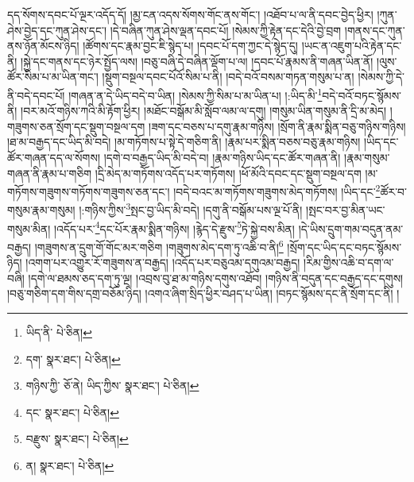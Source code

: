དད་སོགས་དབང་པོ་ལྔར་འདོད་དོ། །མྱ་ངན་འདས་སོགས་གོང་ནས་གོང་། །འཐོབ་པ་ལ་ནི་དབང་བྱེད་ཕྱིར། །ཀུན་ཤེས་བྱེད་དང་ཀུན་ཤེས་དང་། །དེ་བཞིན་ཀུན་ཤེས་ལྡན་དབང་པོ། །སེམས་ཀྱི་རྟེན་དང་དེའི་བྱེ་བྲག །གནས་དང་ཀུན་ནས་ཉོན་མོངས་ཉིད། །ཚོགས་དང་རྣམ་བྱང་ཇི་སྙེད་པ། །དབང་པོ་དག་ཀྱང་དེ་སྙེད་དུ། །ཡང་ན་འཇུག་པའི་རྟེན་དང་ནི། །སྐྱེ་དང་གནས་དང་ཉེར་སྤྱོད་ལས། །བཅུ་བཞི་དེ་བཞིན་ལྡོག་པ་ལ། །དབང་པོ་རྣམས་ནི་གཞན་ཡིན་ནོ། །ལུས་ཚོར་སིམ་པ་མ་ཡིན་གང་། །སྡུག་བསྔལ་དབང་པོའོ་སིམ་པ་ནི། །བདེ་བའོ་བསམ་གཏན་གསུམ་པ་ན། །སེམས་ཀྱི་དེ་ནི་བདེ་དབང་པོ། །གཞན་ན་དེ་ཡིད་བདེ་བ་ཡིན། །སེམས་ཀྱི་སིམ་པ་མ་ཡིན་པ། །:ཡིད་མི་\footnote{ཡིད་ནི་  པེ་ཅིན། }བདེ་བའོ་བཏང་སྙོམས་ནི། །བར་མའོ་གཉིས་ཀའི་མི་རྟོག་ཕྱིར། །མཐོང་བསྒོམ་མི་སློབ་ལམ་ལ་དགུ། །གསུམ་ཡིན་གསུམ་ནི་དྲི་མ་མེད། །གཟུགས་ཅན་སྲོག་དང་སྡུག་བསྔལ་དག །ཟག་དང་བཅས་པ་དགུ་རྣམ་གཉིས། །སྲོག་ནི་རྣམ་སྨིན་བཅུ་གཉིས་གཉིས། །ཐ་མ་བརྒྱད་དང་ཡིད་མི་བདེ། །མ་གཏོགས་པ་སྟེ་དེ་གཅིག་ནི། །རྣམ་པར་སྨིན་བཅས་བཅུ་རྣམ་གཉིས། །ཡིད་དང་ཚོར་གཞན་དད་ལ་སོགས། །དགེ་བ་བརྒྱད་ཡིད་མི་བདེ་བ། །རྣམ་གཉིས་ཡིད་དང་ཚོར་གཞན་ནི། །རྣམ་གསུམ་གཞན་ནི་རྣམ་པ་གཅིག །དྲི་མེད་མ་གཏོགས་འདོད་པར་གཏོགས། །ཕོ་མོའི་དབང་དང་སྡུག་བསྔལ་དག །མ་གཏོགས་གཟུགས་གཏོགས་གཟུགས་ཅན་དང་། །བདེ་བའང་མ་གཏོགས་གཟུགས་མེད་གཏོགས། །ཡིད་དང་\footnote{དག་  སྣར་ཐང་།  པེ་ཅིན། }ཚོར་བ་གསུམ་རྣམ་གསུམ། །:གཉིས་ཀྱིས་\footnote{གཉིས་ཀྱི་  ཅོ་ནེ། ཡིད་ཀྱིས་  སྣར་ཐང་།  པེ་ཅིན། }སྤང་བྱ་ཡིད་མི་བདེ། །དགུ་ནི་བསྒོམ་པས་ལྔ་པོ་ནི། །སྤང་བར་བྱ་མིན་ཡང་གསུམ་མིན། །འདོད་པར་\footnote{དང་  སྣར་ཐང་།  པེ་ཅིན། }དང་པོར་རྣམ་སྨིན་གཉིས། །རྙེད་དེ་རྫུས་\footnote{བརྫུས་  སྣར་ཐང་།  པེ་ཅིན། }ཏེ་སྐྱེ་བས་མིན། །དེ་ཡིས་དྲུག་གམ་བདུན་ནམ་བརྒྱད། །གཟུགས་ན་དྲུག་གོ་གོང་མར་གཅིག །གཟུགས་མེད་དག་ཏུ་འཆི་བ་ནི།\footnote{ན།  སྣར་ཐང་།  པེ་ཅིན། } །སྲོག་དང་ཡིད་དང་བཏང་སྙོམས་ཉིད། །འགག་པར་འགྱུར་རོ་གཟུགས་ན་བརྒྱད། །འདོད་པར་བཅུའམ་དགུའམ་བརྒྱད། །རིམ་གྱིས་འཆི་བ་དག་ལ་བཞི། །དགེ་ལ་ཐམས་ཅད་དག་ཏུ་ལྔ། །འབྲས་བུ་ཐ་མ་གཉིས་དགུས་འཐོབ། །གཉིས་ནི་བདུན་དང་བརྒྱད་དང་དགུས། །བཅུ་གཅིག་དག་གིས་དགྲ་བཅོམ་ཉིད། །འགའ་ཞིག་སྲིད་ཕྱིར་བཤད་པ་ཡིན། །བཏང་སྙོམས་དང་ནི་སྲོག་དང་ནི། །
